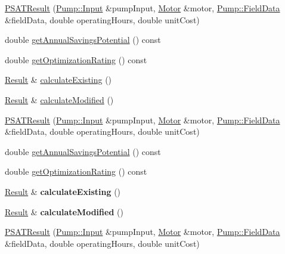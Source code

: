 \begin{DoxyCompactItemize}
\item 
\hyperlink{class_p_s_a_t_result_ad876fe5e1d3da3ad28ccfb6c81f34a98}{P\+S\+A\+T\+Result} (\hyperlink{struct_pump_1_1_input}{Pump\+::\+Input} \&pump\+Input, \hyperlink{struct_motor}{Motor} \&motor, \hyperlink{struct_pump_1_1_field_data}{Pump\+::\+Field\+Data} \&field\+Data, double operating\+Hours, double unit\+Cost)
\item 
double \hyperlink{class_p_s_a_t_result_a14fc75c2e0e92f74e3df1b97ed13b496}{get\+Annual\+Savings\+Potential} () const
\item 
double \hyperlink{class_p_s_a_t_result_aa0a7001461408fcb06a6c22ce2d064db}{get\+Optimization\+Rating} () const
\item 
\hyperlink{struct_p_s_a_t_result_1_1_result}{Result} \& \hyperlink{class_p_s_a_t_result_a83e8e621cdd75e6cf2a4d3f6e48bea11}{calculate\+Existing} ()
\item 
\hyperlink{struct_p_s_a_t_result_1_1_result}{Result} \& \hyperlink{class_p_s_a_t_result_a1404ffd1e9420afd3ff4e9284d145646}{calculate\+Modified} ()
\item 
\hyperlink{class_p_s_a_t_result_ad876fe5e1d3da3ad28ccfb6c81f34a98}{P\+S\+A\+T\+Result} (\hyperlink{struct_pump_1_1_input}{Pump\+::\+Input} \&pump\+Input, \hyperlink{struct_motor}{Motor} \&motor, \hyperlink{struct_pump_1_1_field_data}{Pump\+::\+Field\+Data} \&field\+Data, double operating\+Hours, double unit\+Cost)
\item 
double \hyperlink{class_p_s_a_t_result_a14fc75c2e0e92f74e3df1b97ed13b496}{get\+Annual\+Savings\+Potential} () const
\item 
double \hyperlink{class_p_s_a_t_result_aa0a7001461408fcb06a6c22ce2d064db}{get\+Optimization\+Rating} () const
\item 
\mbox{\label{class_p_s_a_t_result_a949922caf29949199a5de2902851ceb2}} 
\hyperlink{struct_p_s_a_t_result_1_1_result}{Result} \& {\bfseries calculate\+Existing} ()
\item 
\mbox{\label{class_p_s_a_t_result_a37c2bab0e67ac4feb4f04d77aa6a4d77}} 
\hyperlink{struct_p_s_a_t_result_1_1_result}{Result} \& {\bfseries calculate\+Modified} ()
\item 
\hyperlink{class_p_s_a_t_result_ad876fe5e1d3da3ad28ccfb6c81f34a98}{P\+S\+A\+T\+Result} (\hyperlink{struct_pump_1_1_input}{Pump\+::\+Input} \&pump\+Input, \hyperlink{struct_motor}{Motor} \&motor, \hyperlink{struct_pump_1_1_field_data}{Pump\+::\+Field\+Data} \&field\+Data, double operating\+Hours, double unit\+Cost)

\end{DoxyCompactItemize}
